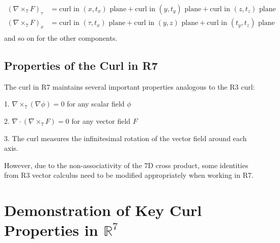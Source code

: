 \documentclass{article}
\begin{document}
\begin{align*}
(\nabla \times_{7} F)_\tau &= \text{curl in } (x,t_x) \text{ plane} + \text{curl in } (y,t_y) \text{ plane} + \text{curl in } (z,t_z) \text{ plane}\\
(\nabla \times_{7} F)_x &= \text{curl in } (\tau,t_x) \text{ plane} + \text{curl in } (y,z) \text{ plane} + \text{curl in } (t_y,t_z) \text{ plane}\\
\end{align*}
and so on for the other components.

\subsection{Properties of the Curl in R7}
The curl in R7 maintains several important properties analogous to the R3 curl:

1. $\nabla \times_{7} (\nabla \phi) = 0$ for any scalar field $\phi$

2. $\nabla \cdot (\nabla \times_{7} F) = 0$ for any vector field $F$

3. The curl measures the infinitesimal rotation of the vector field around each axis.

However, due to the non-associativity of the 7D cross product, some identities from R3 vector calculus need to be modified appropriately when working in R7.


\section{Demonstration of Key Curl Properties in $\mathbb{R}^7$}
\end{document}
